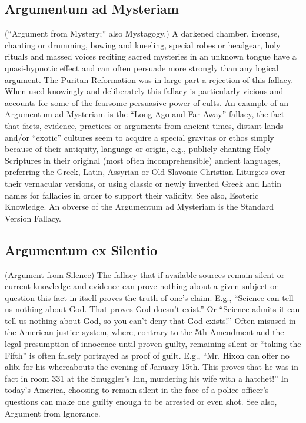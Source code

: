 \documentclass[10pt,a4paper,british]{article}
\begin{document}
\begin{multicols}{2}
    \subsection{Argumentum ad Mysteriam} (``Argument from Mystery;'' also Mystagogy.) A darkened chamber, incense, chanting or drumming, bowing and kneeling, special robes or headgear, holy rituals and massed voices reciting sacred mysteries in an unknown tongue  have a quasi{-}hypnotic effect and can often persuade more strongly than any logical argument.  The Puritan Reformation was in large part a rejection of this fallacy. When used knowingly and deliberately this fallacy is particularly vicious and accounts for some of the fearsome persuasive power of cults.  An example of an Argumentum ad Mysteriam is the ``Long Ago and Far Away'' fallacy, the fact that facts, evidence, practices or arguments from ancient times, distant lands and/or ``exotic'' cultures  seem to acquire a special gravitas or ethos simply because of their antiquity, language or origin, e.g., publicly chanting Holy Scriptures in their original (most often incomprehensible) ancient languages, preferring the Greek, Latin, Assyrian or Old Slavonic Christian Liturgies over their vernacular versions, or using classic or newly invented Greek and Latin names for fallacies in order to support their validity. See also, Esoteric Knowledge. An obverse of the Argumentum ad Mysteriam is the Standard Version Fallacy.  

    \subsection{Argumentum ex Silentio} (Argument from Silence) The fallacy that if available sources remain silent or current knowledge and evidence can prove nothing about a given subject or question this fact in itself proves the truth of one's claim. E.g., ``Science can tell us nothing about God.  That proves God doesn't exist.'' Or ``Science admits it can tell us nothing about God, so you can't deny that God exists!'' Often misused in the American justice system, where, contrary to the 5th Amendment and the legal presumption of innocence until proven guilty,  remaining silent or ``taking the Fifth'' is often falsely portrayed as proof of guilt. E.g., ``Mr. Hixon can offer no alibi for his whereabouts the evening of January 15th. This proves that he was in fact in room 331 at the Smuggler's Inn, murdering his wife with a hatchet!'' In today's America, choosing to remain silent in the face of a police officer's questions can make one guilty enough to be arrested or even shot. See also, Argument from Ignorance.  


\end{multicols}
\end{document}
